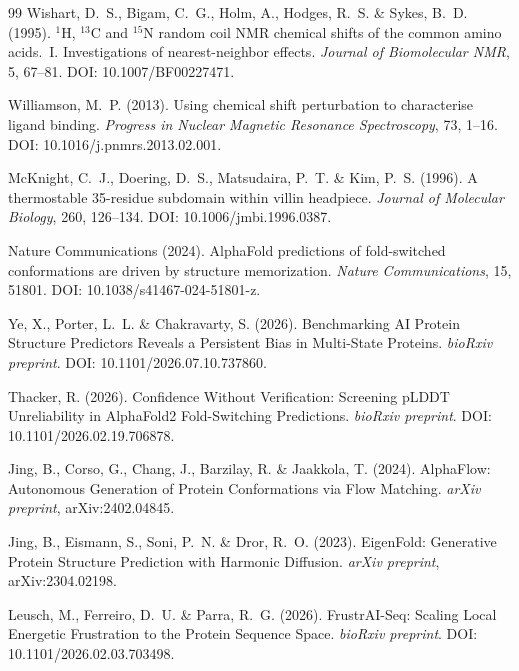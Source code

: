 \documentclass[12pt,a4paper]{article}
\theoremstyle{remark}
\begin{document}
\begin{thebibliography}{99}
Wishart, D.~S., Bigam, C.~G., Holm, A., Hodges, R.~S. \& Sykes, B.~D. (1995).
\newblock $^1$H, $^{13}$C and $^{15}$N random coil NMR chemical shifts of the common amino acids.~I. Investigations of nearest-neighbor effects.
\newblock \textit{Journal of Biomolecular NMR}, 5, 67--81.
\newblock DOI: 10.1007/BF00227471.

Williamson, M.~P. (2013).
\newblock Using chemical shift perturbation to characterise ligand binding.
\newblock \textit{Progress in Nuclear Magnetic Resonance Spectroscopy}, 73, 1--16.
\newblock DOI: 10.1016/j.pnmrs.2013.02.001.

McKnight, C.~J., Doering, D.~S., Matsudaira, P.~T. \& Kim, P.~S. (1996).
\newblock A thermostable 35-residue subdomain within villin headpiece.
\newblock \textit{Journal of Molecular Biology}, 260, 126--134.
\newblock DOI: 10.1006/jmbi.1996.0387.

Nature Communications (2024).
\newblock AlphaFold predictions of fold-switched conformations are driven by structure memorization.
\newblock \textit{Nature Communications}, 15, 51801.
\newblock DOI: 10.1038/s41467-024-51801-z.

Ye, X., Porter, L.~L. \& Chakravarty, S. (2026).
\newblock Benchmarking AI Protein Structure Predictors Reveals a Persistent Bias in Multi-State Proteins.
\newblock \textit{bioRxiv preprint}.
\newblock DOI: 10.1101/2026.07.10.737860.

Thacker, R. (2026).
\newblock Confidence Without Verification: Screening pLDDT Unreliability in AlphaFold2 Fold-Switching Predictions.
\newblock \textit{bioRxiv preprint}.
\newblock DOI: 10.1101/2026.02.19.706878.

Jing, B., Corso, G., Chang, J., Barzilay, R. \& Jaakkola, T. (2024).
\newblock AlphaFlow: Autonomous Generation of Protein Conformations via Flow Matching.
\newblock \textit{arXiv preprint}, arXiv:2402.04845.

Jing, B., Eismann, S., Soni, P.~N. \& Dror, R.~O. (2023).
\newblock EigenFold: Generative Protein Structure Prediction with Harmonic Diffusion.
\newblock \textit{arXiv preprint}, arXiv:2304.02198.

Leusch, M., Ferreiro, D.~U. \& Parra, R.~G. (2026).
\newblock FrustrAI-Seq: Scaling Local Energetic Frustration to the Protein Sequence Space.
\newblock \textit{bioRxiv preprint}.
\newblock DOI: 10.1101/2026.02.03.703498.


\end{thebibliography}
\end{document}
